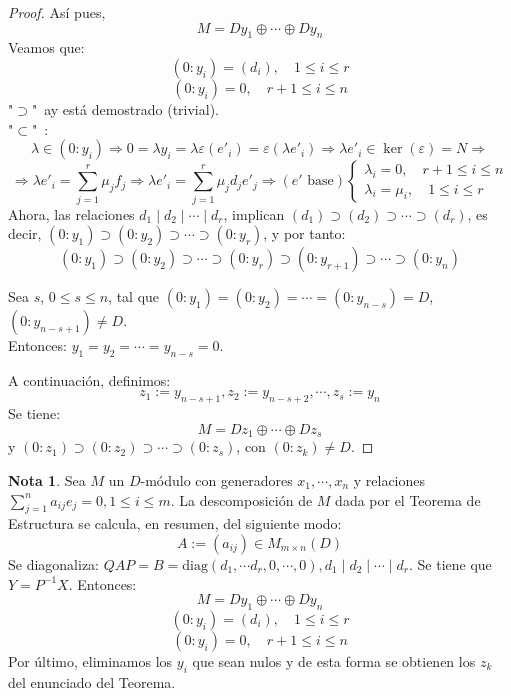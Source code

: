 \documentclass{article}
\theoremstyle{theorem-style}  %
\theoremstyle{definition}
\newtheorem*{note}{Nota} %
\theoremstyle{example-style}
\begin{document}
\begin{proof}
		Así pues, 
		\[ M=Dy_1 \oplus \cdots \oplus Dy_n\]
		Veamos que:
		\[ (0:y_i)=(d_i), \quad  1 \leq i \leq r\]
		\[ (0:y_i)=0, \quad  r+1 \leq i \leq n\]
		"$ \supset $"\ ay está demostrado (trivial).\\
		"$ \subset $"\  :\[ \lambda \in (0:y_i) \Rightarrow 0=\lambda y_i =\lambda \varepsilon(e'_i)= \varepsilon(\lambda e'_i) \Rightarrow \lambda e'_i \in \ker(\varepsilon)=N\Rightarrow \] 
		\[\Rightarrow\lambda e'_i = \sum_{j=1}^{r}\mu_jf_j \Rightarrow \lambda e'_i = \sum_{j=1}^{r} \mu_j d_j e'_j \Rightarrow (e' \text{ base})\begin{cases}
		\lambda_i=0, \quad  r+1 \leq i \leq n \\
		\lambda_i=\mu_i, \quad 1 \leq i \leq r 
		\end{cases} \]
		Ahora, las relaciones $ d_1 \mid d_2 \mid \cdots \mid d_r $, implican $ (d_1)\supset (d_2) \supset \cdots \supset (d_r) $, es decir, $ (0:y_1)\supset(0:y_2)\supset\cdots\supset(0:y_r) $, y por tanto: 
		\[ (0:y_1)\supset(0:y_2)\supset\cdots\supset(0:y_r)\supset(0:y_{r+1})\supset\cdots\supset(0:y_n)\]
		
		Sea $ s $, $ 0 \leq s \leq n $, tal que $ (0:y_1)=(0:y_2)=\cdots =(0:y_{n-s})=D $, $ (0:y_{n-s+1})\neq D $. \\Entonces: $ y_1=y_2=\cdots = y_{n-s}=0 $.
		
		A continuación, definimos: 
		\[ z_1:=y_{n-s+1},z_2:=y_{n-s+2}, \cdots, z_s:=y_n  \]
		Se tiene: 
		\[ M=Dz_1\oplus \cdots \oplus Dz_s \]
		y $ (0:z_1)\supset(0:z_2)\supset\cdots \supset(0:z_s)$, con $ (0:z_k)\neq D $.
	\end{proof}
	\begin{note}
		Sea $ M $ un $ D $-módulo con generadores $ x_1,\cdots, x_n $ y relaciones $\sum_{j=1}^{n}a_{ij}e_j=0, 1 \leq i \leq m$. La descomposición de $ M $ dada por el Teorema de Estructura se calcula, en resumen, del siguiente modo:
		\[ A:=(a_{ij}) \in M_{m \times n}(D) \]
		Se diagonaliza: $ QAP=B= \text{diag}(d_1, \cdots d_r, 0, \cdots, 0),  d_1 \mid d_2 \mid \cdots \mid d_r$. Se tiene que $ Y=P^{-1}X $. Entonces:
		\[ M=Dy_1\oplus \cdots \oplus Dy_n \]
		\[ (0:y_i)=(d_i), \quad  1 \leq i \leq r\]
		\[ (0:y_i)=0, \quad  r+1 \leq i \leq n\]
		Por último, eliminamos los $y_i$ que sean nulos y de esta forma se obtienen los $ z_k $ del enunciado del Teorema.
		 
	\end{note}
	
\end{document}
